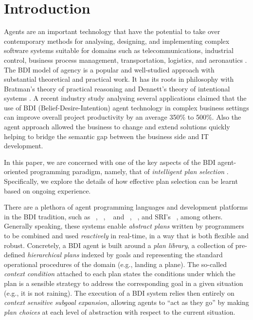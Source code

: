 \section{Introduction}\label{sec:intro}

Agents are an important technology that have the potential to take over
contemporary methods for analysing, designing, and implementing complex software
systems suitable for domains such as telecommunications, industrial control,
business process management, transportation, logistics, and aeronautics
\cite{Jennings:COMACM01,Belecheanu:AAMAS06}.
The BDI model of agency \cite{Pollack:AIJ92-IRMA,Bratman88} is a popular and
well-studied approach with substantial theoretical and practical work. It has its
roots in philosophy with Bratman's \cite{Bratman87:Intentions} theory of practical
reasoning and Dennett's theory of intentional systems \cite{Dennet97:IntentionalStance}.
A recent industry study \cite{Benfield:AAMAS06} analysing several applications
claimed that the use of BDI (Belief-Desire-Intention) agent technology in complex
business settings can improve overall project productivity by an average 350\% to
500\%. Also the agent approach allowed the business to change and extend
solutions quickly helping to bridge the semantic gap between the business side
and IT development.




In this paper, we are concerned with one of the key aspects of the BDI
agent-oriented programming paradigm, namely, that of \emph{intelligent plan
selection} \cite{Pollack92-IRMA,Georgeff89-PRS}.
Specifically, we explore the details of how effective plan selection can be
learnt based on ongoing experience.


There are a plethora of agent programming languages and development platforms in
the BDI tradition, such as  \PRS\ \cite{Georgeff89-PRS},
\JACK~\cite{Busetta99jack}, \TAPL~\cite{Hindriks99:Agent} and
\DAPL~\cite{Dastani:JAAMAS08-2APL}, \JASON~\cite{jasonbook}, and SRI's
\SPARK~\cite{MorelyM:AAMAS04-SPARK}, among others. %
Generally speaking, these systems enable \emph{abstract plans} written by
programmers to be combined and used \emph{reactively} in real-time, in a way that
is both flexible and robust. Concretely, a BDI agent is built around a
\textit{plan library}, a collection of pre-defined \textit{hierarchical plans}
indexed by goals and representing the standard operational procedures of the
domain (e.g., landing a plane).
The so-called \emph{context condition} attached to each plan states the
conditions under which the plan is a sensible strategy to address the
corresponding goal in a given situation (e.g., it is not raining). The execution
of a BDI system relies then entirely on \textit{context sensitive subgoal
expansion}, allowing agents to ``act as they go'' by making \emph{plan choices}
at each level of abstraction with respect to the current situation.




